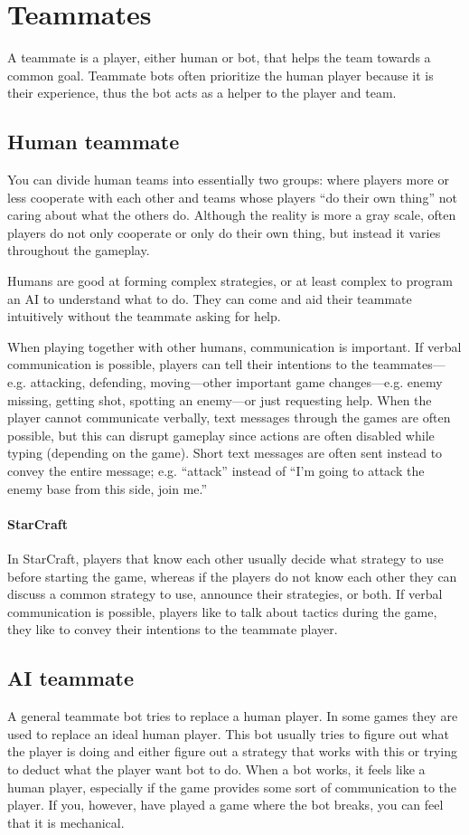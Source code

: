 \section{Teammates}
A teammate is a player, either human or bot, that helps the team towards a common goal. Teammate bots often prioritize the human player because it is their experience, thus the bot acts as a helper to the player and team.

\subsection{Human teammate}
You can divide human teams into essentially two groups: where players more or less cooperate with each other and teams whose players “do their own thing” not caring about what the others do. Although the reality is more a gray scale, often players do not only cooperate or only do their own thing, but instead it varies throughout the gameplay.

Humans are good at forming complex strategies, or at least complex to program an AI to understand what to do. They can come and aid their teammate intuitively without the teammate asking for help.

When playing together with other humans, communication is important. If verbal communication is possible, players can tell their intentions to the teammates—e.g. attacking, defending, moving—other important game changes—e.g. enemy missing, getting shot, spotting an enemy—or just requesting help. When the player cannot communicate verbally, text messages through the games are often possible, but this can disrupt gameplay since actions are often disabled while typing (depending on the game). Short text messages are often sent instead to convey the entire message; e.g. “attack” instead of “I’m going to attack the enemy base from this side, join me.” 

\paragraph{StarCraft}
In StarCraft, players that know each other usually decide what strategy to use before starting the game, whereas if the players do not know each other they can discuss a common strategy to use, announce their strategies, or both. If verbal communication is possible, players like to talk about tactics during the game, they like to convey their intentions to the teammate player.

\subsection{AI teammate}
A general teammate bot tries to replace a human player. In some games they are used to replace an ideal human player. This bot usually tries to figure out what the player is doing and either figure out a strategy that works with this or trying to deduct what the player want bot to do. When a bot works, it feels like a human player, especially if the game provides some sort of communication to the player. If you, however, have played a game where the bot breaks, you can feel that it is mechanical.

